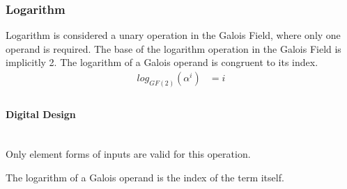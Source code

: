 \subsubsection{Logarithm} Logarithm is considered a unary operation in the
Galois Field, where only one operand is required. The base of the logarithm
operation in the Galois Field is implicitly 2. The logarithm of a Galois
operand is congruent to its index.
    \begin{equation*}
        \begin{split}
            log_{GF(2)}(\alpha^{i}) & = i \\
        \end{split}
    \end{equation*}

    \paragraph{{\small Digital Design}} \leavevmode \\ Only element forms of
    inputs are valid for this operation.

    The logarithm of a Galois operand is the index of the term itself.
